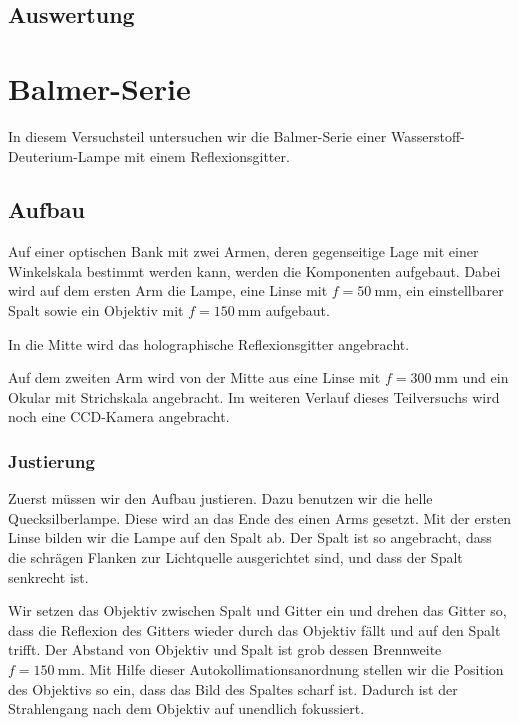 \subsection{Auswertung}


\FloatBarrier
\section{Balmer-Serie}

In diesem Versuchsteil untersuchen wir die Balmer-Serie einer
Wasserstoff-Deuterium-Lampe mit einem Reflexionsgitter.

\FloatBarrier
\subsection{Aufbau}

Auf einer optischen Bank mit zwei Armen, deren gegenseitige Lage mit einer
Winkelskala bestimmt werden kann, werden die Komponenten aufgebaut. Dabei wird
auf dem ersten Arm die Lampe, eine Linse mit $f = \SI{50}{\milli\meter}$, ein
einstellbarer Spalt sowie ein Objektiv mit $f = \SI{150}{\milli\meter}$
aufgebaut.

In die Mitte wird das holographische Reflexionsgitter angebracht.

Auf dem zweiten Arm wird von der Mitte aus eine Linse mit $f =
\SI{300}{\milli\meter}$ und ein Okular mit Strichskala angebracht. Im weiteren
Verlauf dieses Teilversuchs wird noch eine CCD-Kamera angebracht.

\FloatBarrier
\subsubsection{Justierung}

Zuerst müssen wir den Aufbau justieren. Dazu benutzen wir die helle
Quecksilberlampe. Diese wird an das Ende des einen Arms gesetzt. Mit der ersten
Linse bilden wir die Lampe auf den Spalt ab. Der Spalt ist so angebracht, dass
die schrägen Flanken zur Lichtquelle ausgerichtet sind, und dass der Spalt
senkrecht ist.

Wir setzen das Objektiv zwischen Spalt und Gitter ein und drehen das Gitter so,
dass die Reflexion des Gitters wieder durch das Objektiv fällt und auf den
Spalt trifft. Der Abstand von Objektiv und Spalt ist grob dessen Brennweite $f
= \SI{150}{\milli\meter}$. Mit Hilfe dieser Autokollimationsanordnung stellen
wir die Position des Objektivs so ein, dass das Bild des Spaltes scharf ist.
Dadurch ist der Strahlengang nach dem Objektiv auf unendlich fokussiert.

